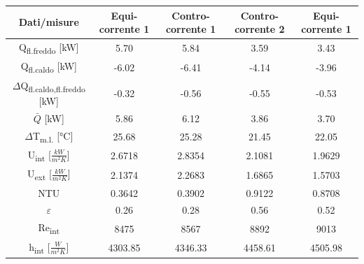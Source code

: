 \documentclass[a4paper,10pt]{article}                                                                                       %
\begin{document}
\begin{table}[ht!]                                                                                                          %
  \centering                                                                                                                %
  \begin{tabular}{||c|c|c|c|c||}                                                                                            %
    \hline
    Dati/misure                                           & Equi-corrente 1 & Contro-corrente 1 & Contro-corrente 2 & Equi-corrente 1 \\
    \hline\hline
    Q\textsubscript{fl.freddo} [kW]                           & 5.70            & 5.84              & 3.59              & 3.43            \\
    Q\textsubscript{fl.caldo} [kW]                            & -6.02           & -6.41             & -4.14             & -3.96           \\
    $\Delta$Q\textsubscript{fl.caldo,fl.freddo} [kW]          & -0.32           & -0.56             & -0.55             & -0.53           \\
    $\bar{Q}$ [kW]                                            & 5.86            & 6.12              & 3.86              & 3.70            \\
    $\Delta$T\textsubscript{m.l.} [°C]                        & 25.68           & 25.28             & 21.45             & 22.05           \\
    U\textsubscript{int} [$\frac{kW}{m^{2}K}$]                & 2.6718          & 2.8354            & 2.1081            & 1.9629          \\
    U\textsubscript{ext} [$\frac{kW}{m^{2}K}$]                & 2.1374          & 2.2683            & 1.6865            & 1.5703          \\
    NTU                                                       & 0.3642          & 0.3902            & 0.9122            & 0.8708          \\
    $\varepsilon$                                             & 0.26            & 0.28              & 0.56              & 0.52            \\
    Re\textsubscript{int}                                     & 8475            & 8567              & 8892              & 9013            \\
    h\textsubscript{int} [$\frac{W}{m^{2}K}$]                 & 4303.85         & 4346.33           & 4458.61           & 4505.98         \\

\end{tabular}
\end{table}
\end{document}
